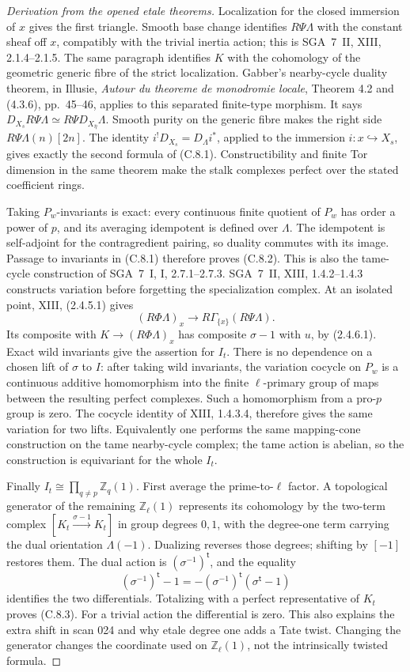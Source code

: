 \begin{proof}[Derivation from the opened etale theorems]
Localization for the closed immersion of $x$ gives the first triangle.
Smooth base change identifies $R\Psi\Lambda$ with the constant sheaf
off $x$, compatibly with the trivial inertia action; this is SGA~7~II,
XIII, 2.1.4--2.1.5. The same paragraph identifies $K$ with the cohomology
of the geometric generic fibre of the strict localization.
Gabber's nearby-cycle duality theorem, in Illusie,
\emph{Autour du theoreme de monodromie locale}, Theorem 4.2 and
(4.3.6), pp.~45--46, applies to this separated finite-type morphism.
It says $D_{X_s}R\Psi\Lambda\simeq R\Psi D_{X_{\bar\eta}}\Lambda$.
Smooth purity on the generic fibre makes the right side
$R\Psi\Lambda(n)[2n]$.
The identity $i^!D_{X_s}=D_\Lambda i^*$, applied to the immersion
$i:x\hookrightarrow X_s$, gives exactly the second formula of (C.8.1).
Constructibility and finite Tor dimension in the same theorem make the
stalk complexes perfect over the stated coefficient rings.

Taking $P_w$-invariants is exact: every continuous finite quotient of
$P_w$ has order a power of $p$, and its averaging idempotent is defined
over $\Lambda$. The idempotent is self-adjoint for the contragredient
pairing, so duality commutes with its image. Passage to invariants in
(C.8.1) therefore proves (C.8.2). This is also the tame-cycle construction
of SGA~7~I, I, 2.7.1--2.7.3.
SGA~7~II, XIII, 1.4.2--1.4.3 constructs variation before forgetting the
specialization complex. At an isolated point, XIII, (2.4.5.1) gives
\[
 (R\Phi\Lambda)_x\longrightarrow
 R\Gamma_{\{x\}}(R\Psi\Lambda).
\]
Its composite with $K\to(R\Phi\Lambda)_x$ has composite $\sigma-1$
with $u$, by (2.4.6.1). Exact wild invariants give the assertion for
$I_t$. There is no dependence on a chosen lift of $\sigma$ to
$I$: after taking wild invariants, the variation cocycle on
$P_w$ is a continuous additive homomorphism into the finite
$\ell$-primary group of maps between the resulting perfect
complexes. Such a homomorphism from a pro-$p$ group is zero.
The cocycle identity of XIII, 1.4.3.4, therefore gives the same
variation for two lifts. Equivalently one performs the same
mapping-cone construction on the tame nearby-cycle complex;
the tame action is abelian, so the construction is equivariant
for the whole $I_t$.

Finally $I_t\cong\prod_{q\ne p}\mathbb Z_q(1)$.
First average the prime-to-$\ell$ factor. A topological generator of the
remaining $\mathbb Z_\ell(1)$ represents its cohomology by the two-term
complex $[K_t\xrightarrow{\sigma-1}K_t]$ in group degrees $0,1$,
with the degree-one term carrying the dual orientation $\Lambda(-1)$.
Dualizing reverses those degrees; shifting by $[-1]$ restores them.
The dual action is $(\sigma^{-1})^{\mathsf t}$, and the equality
\[
 (\sigma^{-1})^{\mathsf t}-1
   =-(\sigma^{-1})^{\mathsf t}(\sigma^{\mathsf t}-1)
\]
identifies the two differentials. Totalizing with a perfect representative
of $K_t$ proves (C.8.3). For a trivial action the differential is zero.
This also explains the extra shift in scan 024 and why etale degree one
adds a Tate twist. Changing the generator changes the coordinate used
on $\mathbb Z_\ell(1)$, not the intrinsically twisted formula.


\end{proof}
